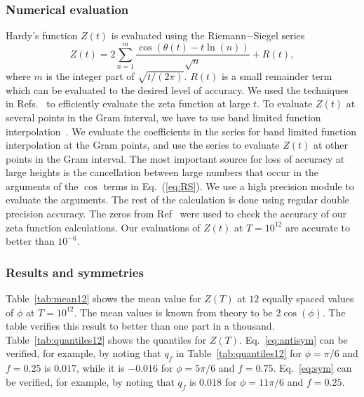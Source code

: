 \documentclass[twoside]{article}
\begin{document}
\subsubsection{\label{numerics}Numerical evaluation}

Hardy's function $Z(t)$  is evaluated using the Riemann$-$Siegel series
\begin{equation}
Z(t) = 2\sum^{m}_{n=1}\frac{\cos(\theta(t) - t \ln (n))}{\sqrt{n}} + R(t), 
\label{eq:RS}
\end{equation}
where $m$ is the integer part of $\sqrt{t/(2\pi)}$. $R(t)$ is a small remainder
term which can be evaluated to the desired level of accuracy. We used the techniques in Refs.~\cite{Odlyzko 1992,hiary,gourdon} 
to efficiently evaluate the zeta function at large $t$. To evaluate  $Z(t)$  at several points in the Gram interval, we have to use band limited function interpolation~\cite{Jerri 1977}. We evaluate the coefficients in the series for band limited function interpolation at the Gram points, and use the series to evaluate $Z(t)$ at other points in the Gram interval. The most important 
source for loss of accuracy at large heights is the cancellation between
large numbers that occur in the arguments of the $\cos$ terms in Eq.~(\ref{eq:RS}). We 
use a high precision module to evaluate the arguments. The rest of the calculation
is done using regular double precision accuracy. The  zeros from Ref~\cite{hiary 2010} were used to check the accuracy of our zeta function calculations. Our evaluations of $Z(t)$ at $T=10^{12}$ are accurate to better than $10^{-6}$. 

\subsubsection{\label{discusssionE12}Results and symmetries}

Table~\ref{tab:mean12} shows the mean value for $Z(T)$ at $12$ equally spaced values of $\phi$ at $T=10^{12}$. The mean values is known from theory to be $2\cos(\phi)$. The table verifies this result to better than one part in a thousand. Table~\ref{tab:quantiles12} shows the quantiles for $Z(T)$. Eq.~\ref{eq:antisym} can be verified, for example, by noting that $q_f$ in Table~\ref{tab:quantiles12}
for $\phi=\pi/6$ and $f=0.25$ is $0.017$, while it is $-0.016$ for $\phi=5\pi/6$ and $f=0.75$. Eq.~\ref{eq:sym} can be verified, for example, by noting that $q_f$ is $0.018$ for $\phi=11\pi/6$ and $f=0.25$.
\end{document}
